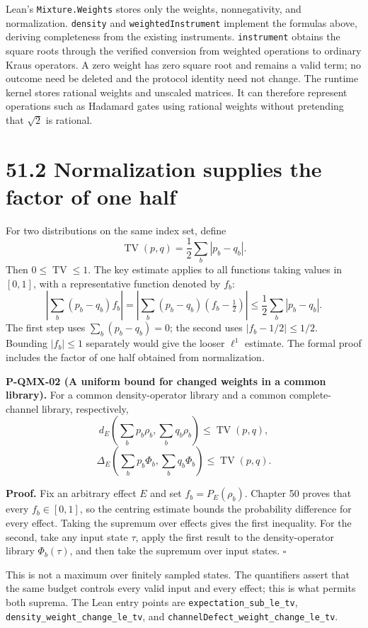 \documentclass[
  11pt,
  oneside]{book}
\begin{document}
Lean's \texttt{Mixture.\allowbreak Weights} stores only the weights, nonnegativity,
and normalization. \texttt{density} and \texttt{weighted\allowbreak Instrument}
implement the formulas above, deriving completeness from the existing
instruments. \texttt{instrument} obtains the square roots through the
verified conversion from weighted operations to ordinary Kraus
operators. A zero weight has zero square root and remains a valid term;
no outcome need be deleted and the protocol identity need not change.
The runtime kernel stores rational weights and unscaled matrices. It can
therefore represent operations such as Hadamard gates using rational
weights without pretending that \(\sqrt2\) is rational.

\section{51.2 Normalization supplies the factor of one half}

For two distributions on the same index set, define \[
\operatorname{TV}(p,q)=\frac12\sum_b|p_b-q_b|.
\] Then \(0\le\operatorname{TV}\le1\). The key estimate applies to all
functions taking values in \([0,1]\), with a representative function
denoted by \(f_b\): \[
\left|\sum_b(p_b-q_b)f_b\right|
=\left|\sum_b(p_b-q_b)(f_b-\tfrac12)\right|
\le\frac12\sum_b|p_b-q_b|.
\] The first step uses \(\sum_b(p_b-q_b)=0\); the second uses
\(|f_b-1/2|\le1/2\). Bounding \(|f_b|\le1\) separately would give the
looser \(\ell^1\) estimate. The formal proof includes the factor of one
half obtained from normalization.

\label{p-qmx-02}{}

\textbf{P-QMX-02 (A uniform bound for changed weights in a common
library).} For a common density-operator library and a common
complete-channel library, respectively, \[
d_E\left(\sum_b p_b\rho_b,\sum_b q_b\rho_b\right)
\le\operatorname{TV}(p,q),
\] \[
\Delta_E\left(\sum_b p_b\Phi_b,\sum_b q_b\Phi_b\right)
\le\operatorname{TV}(p,q).
\]

\textbf{Proof.} Fix an arbitrary effect \(E\) and set
\(f_b=P_E(\rho_b)\). Chapter 50 proves that every \(f_b\in[0,1]\), so
the centring estimate bounds the probability difference for every
effect. Taking the supremum over effects gives the first inequality. For
the second, take any input state \(\tau\), apply the first result to the
density-operator library \(\Phi_b(\tau)\), and then take the supremum
over input states. \(\square\)

This is not a maximum over finitely sampled states. The quantifiers
assert that the same budget controls every valid input and every effect;
this is what permits both suprema. The Lean entry points are
\texttt{expectation\_\allowbreak sub\_\allowbreak le\_\allowbreak tv},
\texttt{density\_\allowbreak weight\_\allowbreak change\_\allowbreak le\_\allowbreak tv}, and
\texttt{channel\allowbreak Defect\_\allowbreak weight\_\allowbreak change\_\allowbreak le\_\allowbreak tv}.
\end{document}
